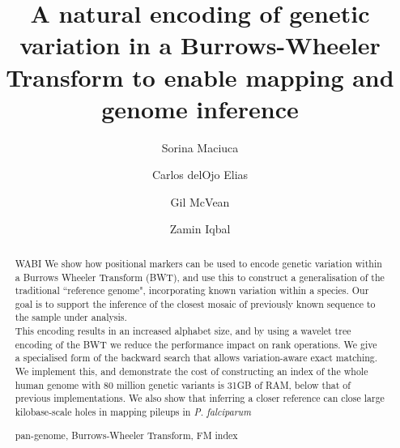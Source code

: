 \documentclass[runningheads,a4paper]{llncs}
\newcommand{\keywords}[1]{\par\addvspace\baselineskip
\noindent\keywordname\enspace\ignorespaces#1}
\begin{document}
\mainmatter  %

\title{A natural encoding of genetic variation in a Burrows-Wheeler Transform  to enable mapping and genome inference}


%
%
\author{Sorina Maciuca%
\and Carlos delOjo Elias\and Gil McVean \and Zamin Iqbal}
%



\maketitle


\begin{abstract} WABI
We show how positional markers can be used to encode genetic variation within a Burrows Wheeler Transform (BWT), and use this to construct a generalisation of the traditional ``reference genome", incorporating known variation within a species. Our goal is to support the inference of the closest mosaic of previously known sequence to the sample under analysis.\\ This encoding results in an increased alphabet size, and by using a wavelet tree encoding of the BWT we reduce the performance impact on rank operations. We give a specialised form of the backward search that allows variation-aware exact matching. We implement this, and demonstrate the cost of constructing an index of the whole human genome with 80 million genetic variants is 31GB of RAM,  below that of previous implementations. We also show that inferring a closer reference can close large kilobase-scale holes in mapping pileups in \textit{P. falciparum}
\keywords{pan-genome, Burrows-Wheeler Transform, FM index}
\end{abstract}
\end{document}
